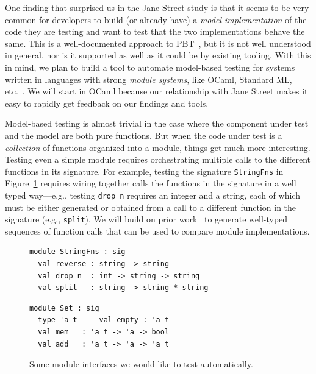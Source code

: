 
One finding that surprised us in the Jane Street study is that
it seems to be {very} common for developers to build (or already have) a
{\em model
implementation} of the code they are testing and want to test that
the two implementations behave the same.  This is a
well-documented approach to
  PBT~\cite{hughes_experiences_2016}, but it is not well understood in general,
  nor is it supported as well as it could
be by existing tooling.
%
With this in mind, we plan to build a tool to automate
model-based testing for systems written in languages with strong {\em
  module systems}, like OCaml, Standard ML, etc.~\cite{macqueen_modules_1984}.
We will start in OCaml because our relationship with Jane Street makes it easy
to rapidly get feedback on our findings and tools.

Model-based testing is almost trivial in the case where
the component under test and the model are both pure functions.  But
when the code under test is a {\em
  collection} of functions
organized into a module, things get much more interesting. Testing even a simple
module requires orchestrating multiple calls to the different functions in
its signature. For example, testing the signature \lstinline{StringFns} in
Figure~\ref{fig:sigs} requires wiring together calls the functions in the
signature in a well typed way---e.g., testing \lstinline{drop_n}
requires an integer and a string, each of which must be either generated or
obtained from a call to a different function in the signature (e.g., \lstinline{split}).
We will build on prior
work~\cite{hughes_experiences_2016} to generate well-typed sequences of function
calls that can be used to compare module implementations.

\begin{figure}[t]
  \begin{minipage}{.45\textwidth}
\begin{lstlisting}
module StringFns : sig
  val reverse : string -> string
  val drop_n  : int -> string -> string
  val split   : string -> string * string
\end{lstlisting}
  \end{minipage}
  \qquad\qquad
  \begin{minipage}{.45\textwidth}
\begin{lstlisting}
module Set : sig
  type 'a t     val empty : 'a t
  val mem   : 'a t -> 'a -> bool
  val add   : 'a t -> 'a -> 'a t
\end{lstlisting}
  \end{minipage}
  \vspace{-2mm}
  \caption{Some module interfaces we would like to test
    automatically.}\label{fig:sigs}
\end{figure}

